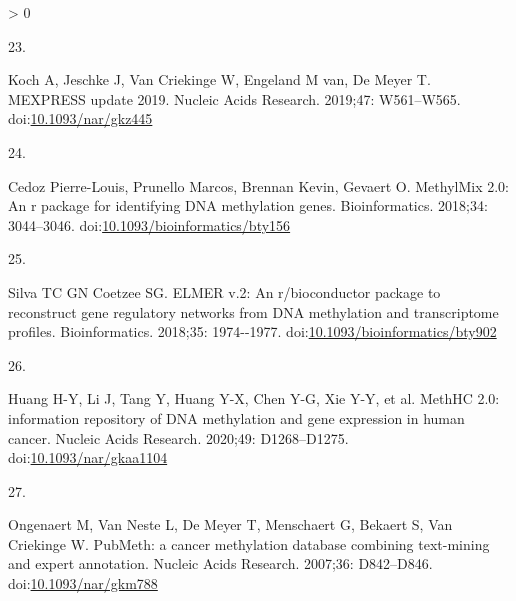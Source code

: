 \documentclass[10pt,letterpaper]{article}
\newlength{\csllabelwidth}
\newlength{\cslhangindent}
\newenvironment{CSLReferences}[2] %
 {%
  \setlength{\parindent}{0pt}
  \ifodd #1 \everypar{\setlength{\hangindent}{\cslhangindent}}\ignorespaces\fi
  \ifnum #2 > 0
  \setlength{\parskip}{#2\baselineskip}
  \fi
 }%
 {}
\newcommand{\CSLLeftMargin}[1]{\parbox[t]{\csllabelwidth}{#1}}
\newcommand{\CSLRightInline}[1]{\parbox[t]{\linewidth - \csllabelwidth}{#1}\break}
\begin{document}
\begin{CSLReferences}{0}{0}
\leavevmode\hypertarget{ref-Koch2019}{}%
\CSLLeftMargin{23. }
\CSLRightInline{Koch A, Jeschke J, Van Criekinge W, Engeland M van, De
Meyer T. {MEXPRESS update 2019}. Nucleic Acids Research. 2019;47:
W561--W565.
doi:\href{https://doi.org/10.1093/nar/gkz445}{10.1093/nar/gkz445}}

\leavevmode\hypertarget{ref-Cedoz2018}{}%
\CSLLeftMargin{24. }
\CSLRightInline{Cedoz Pierre-Louis, Prunello Marcos, Brennan Kevin,
Gevaert O. MethylMix 2.0: An r package for identifying DNA methylation
genes. Bioinformatics. 2018;34: 3044--3046.
doi:\href{https://doi.org/10.1093/bioinformatics/bty156}{10.1093/bioinformatics/bty156}}

\leavevmode\hypertarget{ref-Silva2018}{}%
\CSLLeftMargin{25. }
\CSLRightInline{Silva TC GN Coetzee SG. ELMER v.2: An r/bioconductor
package to reconstruct gene regulatory networks from DNA methylation and
transcriptome profiles. Bioinformatics. 2018;35: 1974-\/-1977.
doi:\href{https://doi.org/10.1093/bioinformatics/bty902}{10.1093/bioinformatics/bty902}}

\leavevmode\hypertarget{ref-Huang2021}{}%
\CSLLeftMargin{26. }
\CSLRightInline{Huang H-Y, Li J, Tang Y, Huang Y-X, Chen Y-G, Xie Y-Y,
et al. {MethHC 2.0: information repository of DNA methylation and gene
expression in human cancer}. Nucleic Acids Research. 2020;49:
D1268--D1275.
doi:\href{https://doi.org/10.1093/nar/gkaa1104}{10.1093/nar/gkaa1104}}

\leavevmode\hypertarget{ref-Ongenaert2007}{}%
\CSLLeftMargin{27. }
\CSLRightInline{Ongenaert M, Van Neste L, De Meyer T, Menschaert G,
Bekaert S, Van Criekinge W. {PubMeth: a cancer methylation database
combining text-mining and expert annotation}. Nucleic Acids Research.
2007;36: D842--D846.
doi:\href{https://doi.org/10.1093/nar/gkm788}{10.1093/nar/gkm788}}

\end{CSLReferences}

\nolinenumbers
\end{document}
